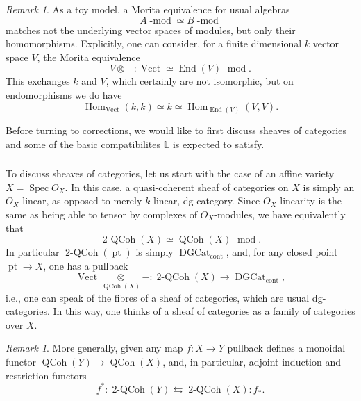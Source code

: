 \documentclass[10pt]{amsart}
\newcommand{\TwoCoh}{\on{2-QCoh}}
\newcommand{\on}{\operatorname}
\renewcommand{\mod}{\on{-mod}}
\newcommand{\Vect}{\on{Vect}}
\theoremstyle{remark}
\newtheorem{re}[subsubsection]{Remark}
\newcommand{\End}{\operatorname{End}}
\newcommand{\Hom}{\operatorname{Hom}}
\numberwithin{equation}{section}
\newcommand{\msf}{\operatorname}
\renewcommand{\mod}{\operatorname{-mod}}
\newcommand{\QCoh}{\on{QCoh}}
\newcommand{\DGCat}{\msf{DGCat}_{\on{cont}}}
\begin{document}
	\begin{re}  As a toy model, a Morita equivalence for usual algebras 
    \[
        A\mod \simeq B\mod
    \]
	matches not the underlying vector spaces of 
	modules, but 
	only their homomorphisms. Explicitly, one can consider, for a finite 
	dimensional $k$ vector space $V$, the Morita equivalence 
	\[
	   V \otimes -  :\Vect \simeq  \End(V)\mod.
	\] 
	This exchanges $k$ and $V$, which certainly are not isomorphic, but on 
	endomorphisms we do have
	\[
	     \Hom_{\Vect}(k, k) \simeq k \simeq \Hom_{\End(V)}(V,V).
	\]
		\end{re}

	
	Before turning to corrections, we would like to first discuss  
	sheaves of categories and  some of the basic compatibilites $\mathbb{L}$ 
	is 
	expected to satisfy. 
	
	\subsubsection{}   To discuss sheaves of categories, let us start with the 
	case of an affine variety $X = \on{Spec }O_X$. In this case, a 
	quasi-coherent 
	sheaf of categories on $X$ is simply an $O_X$-linear, as opposed to merely
	$k$-linear, dg-category. Since $O_X$-linearity is the same as being able to 
	tensor by complexes of $O_X$-modules, we have equivalently that 
	\[
	  \TwoCoh(X) \simeq \QCoh(X)\mod.
	\]
	In particular $\TwoCoh(\on{pt})$ is simply $\DGCat$, and, for any closed 
	point $ \on{pt} \rightarrow X$, one has a pullback 
	\[
	  \Vect \underset{ \QCoh(X)} \otimes  -: \TwoCoh(X) \rightarrow \DGCat, 
	\]
	i.e., one can speak of the fibres of a sheaf of categories, which are usual 
	dg-categories. In this way, one thinks of a sheaf of categories as a 
	family of categories over $X$. 
	
	
	
	\begin{re}\label{r:pushpull2coh} More generally, given any map $f: X 
	\rightarrow Y$ pullback 
	defines a monoidal functor $\QCoh(Y) \rightarrow \QCoh(X)$, and, in 
	particular, adjoint induction and restriction functors 
		\[
		    f^*: \TwoCoh(Y) \leftrightarrows \TwoCoh(X): f_*. 
		\]
	\end{re}
	
\end{document}
